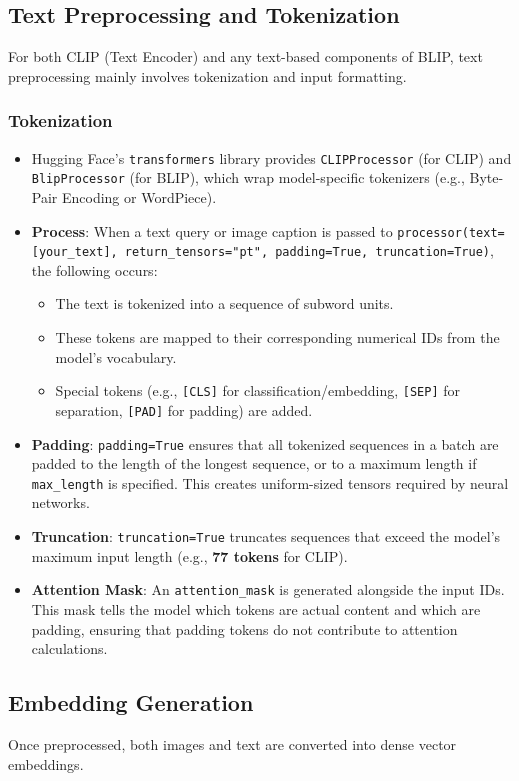 \documentclass{article}
\begin{document}
\subsection{Text Preprocessing and Tokenization}
For both CLIP (Text Encoder) and any text-based components of BLIP, text preprocessing mainly involves tokenization and input formatting.

\subsubsection{Tokenization}
\begin{itemize}
    \item Hugging Face's \texttt{transformers} library provides \texttt{CLIPProcessor} (for CLIP) and \texttt{BlipProcessor} (for BLIP), which wrap model-specific tokenizers (e.g., Byte-Pair Encoding or WordPiece).
    \item \textbf{Process}: When a text query or image caption is passed to \texttt{processor(text=[your\_text], return\_tensors="pt", padding=True, truncation=True)}, the following occurs:
    \begin{itemize}
        \item The text is tokenized into a sequence of subword units.
        \item These tokens are mapped to their corresponding numerical IDs from the model's vocabulary.
        \item Special tokens (e.g., \texttt{[CLS]} for classification/embedding, \texttt{[SEP]} for separation, \texttt{[PAD]} for padding) are added.
    \end{itemize}
    \item \textbf{Padding}: \texttt{padding=True} ensures that all tokenized sequences in a batch are padded to the length of the longest sequence, or to a maximum length if \texttt{max\_length} is specified. This creates uniform-sized tensors required by neural networks.
    \item \textbf{Truncation}: \texttt{truncation=True} truncates sequences that exceed the model's maximum input length (e.g., \textbf{77 tokens} for CLIP).
    \item \textbf{Attention Mask}: An \texttt{attention\_mask} is generated alongside the input IDs. This mask tells the model which tokens are actual content and which are padding, ensuring that padding tokens do not contribute to attention calculations.
\end{itemize}

\subsection{Embedding Generation}
Once preprocessed, both images and text are converted into dense vector embeddings.
\end{document}
